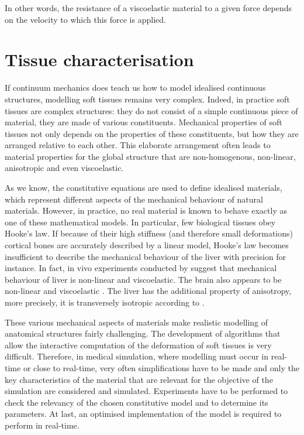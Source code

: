 In other words, the resistance of a viscoelastic material to a given force depends on the velocity to which this force is applied. 

			
\section{Tissue characterisation}

\ON If continuum mechanics does teach us how to model idealised continuous structures, modelling soft tissues remains very complex. Indeed, in practice soft tissues are complex structures: they do not consist of a simple continuous piece of material, they are made of various constituents. Mechanical properties of soft tissues not only depends on the properties of these constituents, but how they are arranged relative to each other. This elaborate arrangement often leads to material properties for the global structure that are non-homogenous, non-linear, anisotropic and even viscoelastic.

As we know, \OFF the constitutive equations are used to define idealised materials, which represent different aspects of the mechanical behaviour of natural materials. \ON However, in practice, \OFF no real material is known to behave exactly as one of these mathematical models. In particular, few biological tissues obey Hooke's law. If because of their high stiffness (and therefore small deformations) cortical bones are accurately described by a linear model, Hooke's law becomes insufficient to describe the mechanical behaviour of the liver with precision for instance. In fact, in vivo experiments conducted by \cite{Melvin73} suggest that mechanical behaviour of liver is non-linear and viscoelastic. The brain also appears to be non-linear and viscoelastic \citep{Miller97}. The liver has the additional property of anisotropy, more precisely, it is transversely isotropic according to \cite{Chui07}. 

These various mechanical aspects of materials make realistic modelling of anatomical structures fairly challenging. \ON The development of algorithms that allow the interactive computation of the deformation of soft tissues is very difficult. Therefore, \OFF in medical simulation, where modelling must occur in real-time or close to real-time, very often simplifications have to be made \ON and only the key characteristics of the material that are relevant for the objective of the simulation are considered and simulated. Experiments have to be performed to check the relevancy of the chosen constitutive model and to determine its parameters. At last, an optimised implementation of the model is required to perform in real-time.

